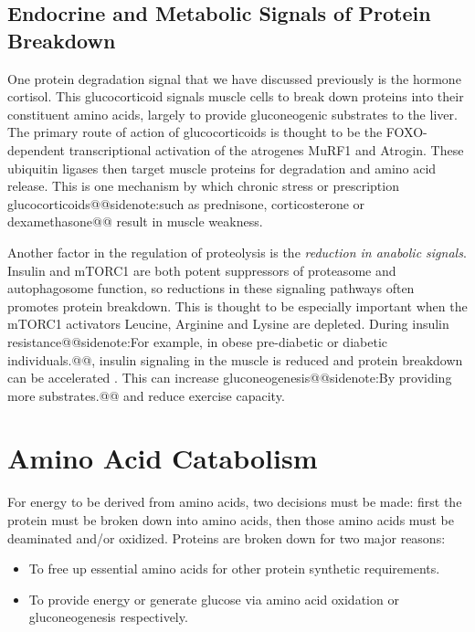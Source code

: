 \documentclass{tufte-handout}
\makeatletter
\def\sidenote#1{@@sidenote:#1@@}
\makeatother
\begin{document}
\subsection{Endocrine and Metabolic Signals of Protein Breakdown}

One protein degradation signal that we have discussed previously is the hormone cortisol.  This glucocorticoid signals muscle cells to break down proteins into their constituent amino acids, largely to provide gluconeogenic substrates to the liver.  The primary route of action of glucocorticoids is thought to be the FOXO-dependent transcriptional activation of the atrogenes MuRF1 and Atrogin.  These ubiquitin ligases then target muscle proteins for degradation and amino acid release.  This is one mechanism by which chronic stress or prescription glucocorticoids\sidenote{such as prednisone, corticosterone or dexamethasone} result in muscle weakness.

Another factor in the regulation of proteolysis is the \emph{reduction in anabolic signals}.  Insulin and mTORC1 are both potent suppressors of proteasome and autophagosome function, so reductions in these signaling pathways often promotes protein breakdown.  This is thought to be especially important when the mTORC1 activators Leucine, Arginine and Lysine are depleted.  During insulin resistance\sidenote{For example, in obese pre-diabetic or diabetic individuals.}, insulin signaling in the muscle is reduced and protein breakdown can be accelerated \citep{Wang2006b}.  This can increase gluconeogenesis\sidenote{By providing more substrates.} and reduce exercise capacity.

\section{Amino Acid Catabolism}

For energy to be derived from amino acids, two decisions must be made: first the protein must be broken down into amino acids, then those amino acids must be deaminated and/or oxidized. Proteins are broken down for two major reasons:

\begin{itemize}
\item To free up essential amino acids for other protein synthetic requirements.
\item To provide energy or generate glucose via amino acid oxidation or gluconeogenesis respectively.
\end{itemize}	
\end{document}
